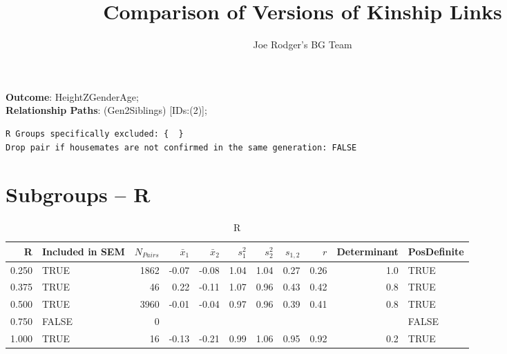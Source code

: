 \documentclass{article}\usepackage[]{graphicx}\usepackage[]{color}
\title{Comparison of Versions of Kinship Links}
\author{Joe Rodger's BG Team}
\makeatletter
\newenvironment{kframe}{%
 \def\at@end@of@kframe{}%
 \ifinner\ifhmode%
  \def\at@end@of@kframe{\end{minipage}}%
  \begin{minipage}{\columnwidth}%
 \fi\fi%
 \def\FrameCommand##1{\hskip\@totalleftmargin \hskip-\fboxsep
 \colorbox{shadecolor}{##1}\hskip-\fboxsep
     \hskip-\linewidth \hskip-\@totalleftmargin \hskip\columnwidth}%
 \MakeFramed {\advance\hsize-\width
   \@totalleftmargin\z@ \linewidth\hsize
   \@setminipage}}%
 {\par\unskip\endMakeFramed%
 \at@end@of@kframe}
\newenvironment{knitrout}{}{} %
\makeatother
\begin{document}
\maketitle
\setcounter{totalnumber}{8} %

\setlength{\parindent}{0pt}%














\textbf{Outcome}: HeightZGenderAge;\\
\textbf{Relationship Paths}: (Gen2Siblings) [IDs:(2)];\\

\begin{knitrout}
\color{fgcolor}\begin{kframe}
\begin{verbatim}
R Groups specifically excluded: {  }
Drop pair if housemates are not confirmed in the same generation: FALSE
\end{verbatim}
\end{kframe}
\end{knitrout}

\section{Subgroups --  R }%
\begin{table}[ht]
\centering
\begin{tabular}{rlrrrrrrrrl}
  \hline
R & Included in SEM & $N_{Pairs}$ & $\bar{x}_1$ & $\bar{x}_2$ & $s_1^2$ & $s_2^2$ & $s_{1,2}$ & $r$ & Determinant & PosDefinite \\ 
  \hline
0.250 & TRUE & 1862 & -0.07 & -0.08 & 1.04 & 1.04 & 0.27 & 0.26 & 1.0 & TRUE \\ 
  0.375 & TRUE & 46 & 0.22 & -0.11 & 1.07 & 0.96 & 0.43 & 0.42 & 0.8 & TRUE \\ 
  0.500 & TRUE & 3960 & -0.01 & -0.04 & 0.97 & 0.96 & 0.39 & 0.41 & 0.8 & TRUE \\ 
  0.750 & FALSE & 0 &  &  &  &  &  &  &  & FALSE \\ 
  1.000 & TRUE & 16 & -0.13 & -0.21 & 0.99 & 1.06 & 0.95 & 0.92 & 0.2 & TRUE \\ 
   \hline
\end{tabular}
\caption{R} 
\end{table}
\end{document}
